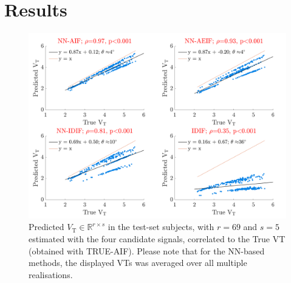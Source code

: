 \vspace{-0.5cm}

\section{Results} \label{sec:results}
    \begin{figure}
        \vspace{-0.5cm}
        
        \centering
        
        \includegraphics[width=1.0\linewidth]{Figures/correlation.png}
        
        \vspace{-0.25cm}
        
        \captionsetup{singlelinecheck=false, justification=centering}
        \caption{
            \scriptsize
            Predicted $V_{\mathrm{T}} \in \mathbb{R}^{r \times s}$ in the test-set subjects, with $r = 69$ and $s=5$ estimated with the four candidate signals, correlated to the True \gls{VT} (obtained with TRUE-\gls{AIF}). Please note that for the \gls{NN}-based methods, the displayed \glspl{VT} was averaged over all multiple realisations.
        }
        
        \label{fig:correlation}
        
   \end{figure}

